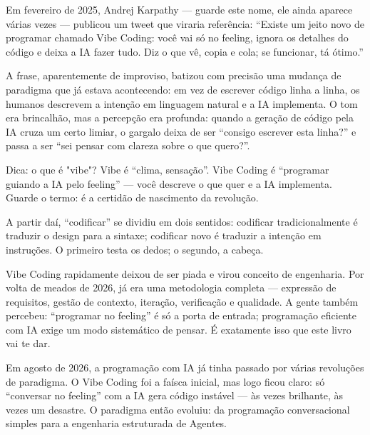 


Em fevereiro de 2025, Andrej Karpathy — guarde este nome, ele ainda aparece várias vezes — publicou um tweet que viraria referência: “Existe um jeito novo de programar chamado Vibe Coding: você vai só no feeling, ignora os detalhes do código e deixa a IA fazer tudo. Diz o que vê, copia e cola; se funcionar, tá ótimo.”

A frase, aparentemente de improviso, batizou com precisão uma mudança de paradigma que já estava acontecendo: em vez de escrever código linha a linha, os humanos descrevem a intenção em linguagem natural e a IA implementa. O tom era brincalhão, mas a percepção era profunda: quando a geração de código pela IA cruza um certo limiar, o gargalo deixa de ser “consigo escrever esta linha?” e passa a ser “sei pensar com clareza sobre o que quero?”.

\begin{tcbinfo}{Dica: o que é "vibe"?}
Vibe é “clima, sensação”. Vibe Coding é “programar guiando a IA pelo feeling” — você descreve o que quer e a IA implementa. Guarde o termo: é a certidão de nascimento da revolução.

\end{tcbinfo}

A partir daí, “codificar” se dividiu em dois sentidos: codificar tradicionalmente é traduzir o design para a sintaxe; codificar novo é traduzir a intenção em instruções. O primeiro testa os dedos; o segundo, a cabeça.

Vibe Coding rapidamente deixou de ser piada e virou conceito de engenharia. Por volta de meados de 2026, já era uma metodologia completa — expressão de requisitos, gestão de contexto, iteração, verificação e qualidade. A gente também percebeu: “programar no feeling” é só a porta de entrada; programação eficiente com IA exige um modo sistemático de pensar. É exatamente isso que este livro vai te dar.


Em agosto de 2026, a programação com IA já tinha passado por várias revoluções de paradigma. O Vibe Coding foi a faísca inicial, mas logo ficou claro: só “conversar no feeling” com a IA gera código instável — às vezes brilhante, às vezes um desastre. O paradigma então evoluiu: da programação conversacional simples para a engenharia estruturada de Agentes.

